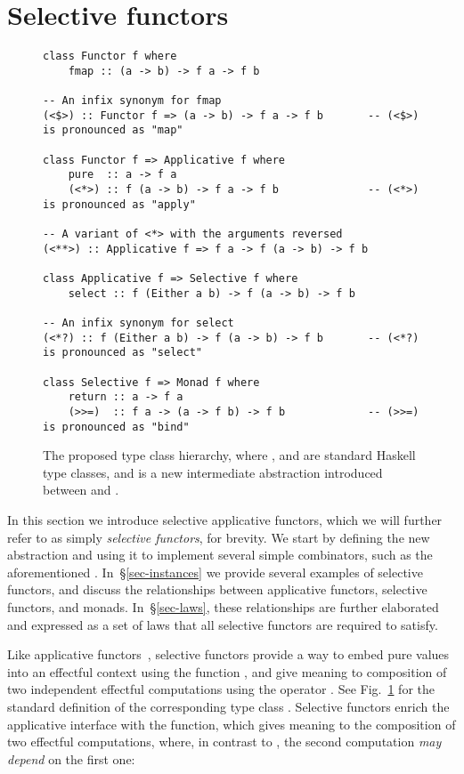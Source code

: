\section{Selective functors}\label{sec-selective}

\begin{figure}
\begin{verbatim}
class Functor f where
    fmap :: (a -> b) -> f a -> f b

-- An infix synonym for fmap
(<$>) :: Functor f => (a -> b) -> f a -> f b       -- (<$>) is pronounced as "map"

class Functor f => Applicative f where
    pure  :: a -> f a
    (<*>) :: f (a -> b) -> f a -> f b              -- (<*>) is pronounced as "apply"

-- A variant of <*> with the arguments reversed
(<**>) :: Applicative f => f a -> f (a -> b) -> f b

class Applicative f => Selective f where
    select :: f (Either a b) -> f (a -> b) -> f b

-- An infix synonym for select
(<*?) :: f (Either a b) -> f (a -> b) -> f b       -- (<*?) is pronounced as "select"

class Selective f => Monad f where
    return :: a -> f a
    (>>=)  :: f a -> (a -> f b) -> f b             -- (>>=) is pronounced as "bind"
\end{verbatim}
\caption{The proposed type class hierarchy, where , 
and  are standard Haskell type classes, and  is
a new intermediate abstraction introduced between  and
.}\label{fig-types}
\end{figure}

In this section we introduce selective applicative functors, which we will
further refer to as simply \emph{selective functors}, for brevity. We start by
defining the new abstraction and using it to implement several simple
combinators, such as the aforementioned . In~\S\ref{sec-instances} we
provide several examples of selective functors, and discuss the relationships
between applicative functors, selective functors, and monads.
In~\S\ref{sec-laws}, these relationships are further elaborated and expressed
as a set of laws that all selective functors are required to satisfy.

Like applicative functors~\citep{mcbride2008applicative}, selective functors
provide a way to embed pure values into an effectful context  using the
function , and give meaning to composition of two independent effectful
computations using the operator \hs{<*>}. See Fig.~\ref{fig-types} for the
standard definition of the corresponding type class . Selective
functors enrich the applicative interface with the  function, which
gives meaning to the composition of two effectful computations, where, in
contrast to \hs{<*>}, the second computation \emph{may depend} on the first one:

